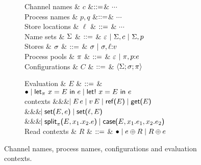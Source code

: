 \begin{figure*}[t]
\centering
\begin{subfigure}{0.35\textwidth}
\begin{grammar}
  Channel names & $c$   &$\mathrel{::=}$& $\cdots$
  \\
  Process names & $p,q$ &$\mathrel{::=}$& $\cdots$
  \\
  Store locations & $\ell$ & $\mathrel{::=}$ & $\cdots$
  \\[1mm]
  Name sets
  & $\Sigma$ 
    & $\mathrel{::=}$ & $\varepsilon ~|~ \Sigma, c ~|~ \Sigma, p$
  \\
  Stores & $\sigma$ & $\mathrel{::=}$ & $\sigma ~|~ \sigma, \ell{:}v$
  \\
  Process pools
  & $\pi$ 
    & $\mathrel{::=}$ & $\varepsilon ~|~ \pi, p{:}e$
    \\[1mm]
  Configurations
  & $C$
     & $\mathrel{::=}$ & $\left<\Sigma;\sigma;\pi\right> $
     \\[1mm]
\end{grammar}
\end{subfigure}%
\begin{subfigure}{0.5\textwidth}
\begin{grammar}
 Evaluation
  & $E$
     & $\mathrel{::=}$ & 
 $\bullet \mathrel{\mid} \text{\textsf{let}}_{\pi}\ {x} = {E}\ \text{\textsf{in}}\ {e} \mathrel{\mid} \text{\textsf{let!}}\ {x} = {E}\ \text{\textsf{in}}\ {e}$
\\ contexts &&& $\hspace{-1.02ex}\mathrel{\mid} E\,e \mathrel{\mid} v\,E \mathrel{\mid} \text{\textsf{ref}}\textsf{(}{E}\textsf{)} \mathrel{\mid} \text{\textsf{get}}\textsf{(}{E}\textsf{)}$
     \\ &&& $\hspace{-1.02ex}\mathrel{\mid} \text{\textsf{set}}\textsf{(}{E},{e}\textsf{)} \mathrel{\mid} \text{\textsf{set}}\textsf{(}{\ell},{E}\textsf{)}$
\\ &&& $\hspace{-1.02ex}\mathrel{\mid} \text{\textsf{split}}_{\pi}\textsf{(}{E},{x_1}.{x_2}.{e}\textsf{)} \mathrel{\mid} \text{\textsf{case}}\textsf{(}{E},{x_1}.{e_1},{x_2}.{e_2}\textsf{)}$
\\[1mm]
 Read contexts
  & $R$
     & $\mathrel{::=}$ & $\bullet \mathrel{\mid} e \oplus R \mathrel{\mid} R \oplus e$
\end{grammar}
\end{subfigure}
\caption{Channel names, process names, configurations and evaluation contexts.}
\label{fig:configs}
\end{figure*}

